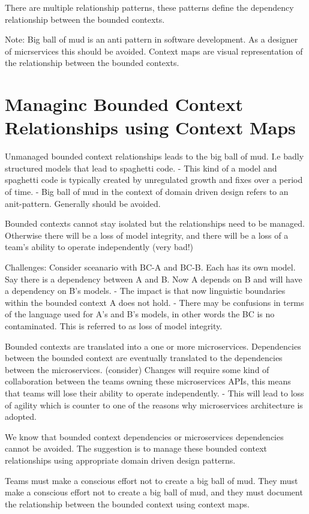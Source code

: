 There are multiple relationship patterns, these patterns define the dependency relationship between the bounded contexts.

Note:
Big ball of mud is an anti pattern in software development. As a designer of micrservices this should be avoided.
Context maps are visual representation of the relationship between the bounded contexts.


\section{Managinc Bounded Context Relationships using Context Maps}
Unmanaged bounded context relationships leads to the big ball of mud. I.e badly structured models that lead to spaghetti code.
- This kind of a model and spaghetti code is typically created by unregulated growth and fixes over a period of time.
- Big ball of mud in the context of domain driven design refers to an anit-pattern. Generally should be avoided.

Bounded contexts cannot stay isolated but the relationships need to be managed.
Otherwise there will be a loss of model integrity, and there will be a loss of a team's ability to operate independently (very bad!)

Challenges:
Consider sceanario with BC-A and BC-B. Each has its own model.
Say there is a dependency between A and B. Now A depends on B and will have a dependency on B's models.
- The impact is that now linguistic boundaries within the bounded context A does not hold.
- There may be confusions in terms of the language used for A's and B's models, in other words the BC is no contaminated. This is referred to as loss of model integrity.

Bounded contexts are translated into a one or more microservices.
Dependencies between the bounded context are eventually translated to the dependencies between the microservices. (consider)
Changes will require some kind of collaboration between the teams owning these microservices APIs, this means that teams will lose their ability to operate independently.
- This will lead to loss of agility which is counter to one of the reasons why microservices architecture is adopted.

We know that bounded context dependencies or microservices dependencies cannot be avoided.
The suggestion is to manage these bounded context relationships using appropriate domain driven design patterns.

Teams must make a conscious effort not to create a big ball of mud.
They must make a conscious effort not to create a big ball of mud, and they must document the relationship between the bounded context using context maps.

